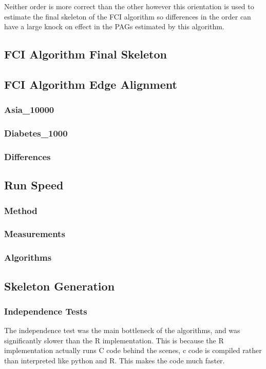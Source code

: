 \documentclass{article}
\begin{document}
Neither order is more correct than the other however this orientation is used to estimate the final skeleton of the FCI algorithm so differences in the order can have a large knock on effect in the PAGs estimated by this algorithm.

\subsection{FCI Algorithm Final Skeleton}


\subsection{FCI Algorithm Edge Alignment}
\subsubsection{Asia\_10000}
\subsubsection{Diabetes\_1000}
\subsubsection{Differences}
\subsection{Run Speed}
\subsubsection{Method}
\subsubsection{Measurements}
\subsubsection{Algorithms}
\subsection{Skeleton Generation}
\subsubsection{Independence Tests}
The independence test was the main bottleneck of the algorithms, and was significantly slower than the R implementation. This is because the R implementation actually runs C code behind the scenes, c code is compiled rather than interpreted like python and R. This makes the code much faster.\\
\end{document}
